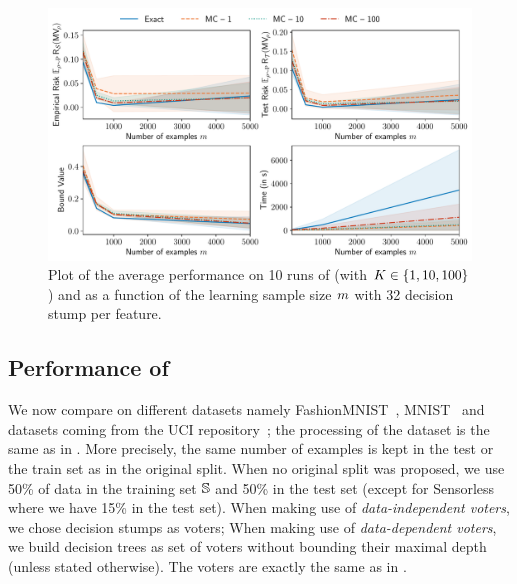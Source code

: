 \begin{figure}
    \centering
    \includegraphics[width=1.0\linewidth]{chapter_5/figures/moons_size.pdf}
    \caption[Plot of the Performance of  on Moons (2/2)]{Plot of the average performance on 10 runs of  (with $\K\in\{1, 10, 100\}$) and  as a function of the learning sample size $\m$ with 32 decision stump per feature.}
    \label{chap:mv-sto:fig:moons-size}
\end{figure}

\subsection{Performance of }

We now compare  on different datasets namely \mbox{FashionMNIST}~\citep{XiaoRasulVollgraf2017}, MNIST~\citep{LeCunCortesBurges1998} and datasets coming from the UCI repository~\citep{DuaGraff2017}; the processing of the dataset is the same as in .
More precisely, the same number of examples is kept in the test or the train set as in the original split.
When no original split was proposed, we use 50\% of data in the training set $\S$ and 50\% in the test set (except for Sensorless where we have 15\% in the test set).
When making use of {\it data-independent voters}, we chose decision stumps as voters;
When making use of {\it data-dependent voters}, we build decision trees as set of voters without bounding their maximal depth (unless stated otherwise).
The voters are exactly the same as in .

